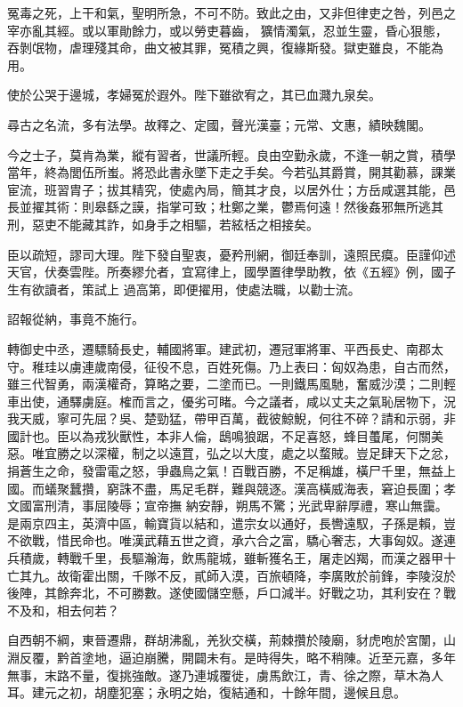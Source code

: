 \begin{pinyinscope}
 冤毒之死，上干和氣，聖明所急，不可不防。致此之由，又非但律吏之咎，列邑之宰亦亂其經。或以軍勛餘力，或以勞吏暮齒，
 獷情濁氣，忍並生靈，昏心狠態，吞剝氓物，虐理殘其命，曲文被其罪，冤積之興，復緣斯發。獄吏雖良，不能為用。



 使於公哭于邊城，孝婦冤於遐外。陛下雖欲宥之，其已血濺九泉矣。



 尋古之名流，多有法學。故釋之、定國，聲光漢臺；元常、文惠，績映魏閣。



 今之士子，莫肯為業，縱有習者，世議所輕。良由空勤永歲，不逢一朝之賞，積學當年，終為閭伍所蚩。將恐此書永墜下走之手矣。今若弘其爵賞，開其勸慕，課業宦流，班習胄子；拔其精究，使處內局，簡其才良，以居外仕；方岳咸選其能，邑長並擢其術：則皋繇之謨，指掌可致；杜鄭之業，鬱焉何遠！然後姦邪無所逃其刑，惡吏不能藏其詐，如身手之相驅，若絃栝之相接矣。



 臣以疏短，謬司大理。陛下發自聖衷，憂矜刑網，御廷奉訓，遠照民瘼。臣謹仰述天官，伏奏雲陛。所奏繆允者，宜寫律上，國學置律學助教，依《五經》例，國子生有欲讀者，策試上
 過高第，即便擢用，使處法職，以勸士流。



 詔報從納，事竟不施行。



 轉御史中丞，遷驃騎長史，輔國將軍。建武初，遷冠軍將軍、平西長史、南郡太守。稚珪以虜連歲南侵，征役不息，百姓死傷。乃上表曰：匈奴為患，自古而然，雖三代智勇，兩漢權奇，算略之要，二塗而已。一則鐵馬風馳，奮威沙漠；二則輕車出使，通驛虜庭。榷而言之，優劣可睹。今之議者，咸以丈夫之氣恥居物下，況我天威，寧可先屈？吳、楚勁猛，帶甲百萬，截彼鯨鯢，何往不碎？請和示弱，非國計也。臣以為戎狄獸性，本非人倫，鴟鳴狼踞，不足喜怒，蜂目蠆尾，何關美惡。唯宜勝之以深權，制之以遠罝，弘之以大度，處之以蝥賊。豈足肆天下之忿，捐蒼生之命，發雷電之怒，爭蟲鳥之氣！百戰百勝，不足稱雄，橫尸千里，無益上國。而蟻聚蠶攢，窮誅不盡，馬足毛群，難與競逐。漢高橫威海表，窘迫長圍；孝文國富刑清，事屈陵辱；宣帝撫
 納安靜，朔馬不驚；光武卑辭厚禮，寒山無靄。是兩京四主，英濟中區，輸寶貨以結和，遣宗女以通好，長轡遠馭，子孫是賴，豈不欲戰，惜民命也。唯漢武藉五世之資，承六合之富，驕心奢志，大事匈奴。遂連兵積歲，轉戰千里，長驅瀚海，飲馬龍城，雖斬獲名王，屠走凶羯，而漢之器甲十亡其九。故衛霍出關，千隊不反，貳師入漠，百旅頓降，李廣敗於前鋒，李陵沒於後陣，其餘奔北，不可勝數。遂使國儲空懸，戶口減半。好戰之功，其利安在？戰不及和，相去何若？



 自西朝不綱，東晉遷鼎，群胡沸亂，羌狄交橫，荊棘攢於陵廟，豺虎咆於宮闈，山淵反覆，黔首塗地，逼迫崩騰，開闢未有。是時得失，略不稍陳。近至元嘉，多年無事，末路不量，復挑強敵。遂乃連城覆徙，虜馬飲江，青、徐之際，草木為人耳。建元之初，胡塵犯塞；永明之始，復結通和，十餘年間，邊候且息。




\end{pinyinscope}
